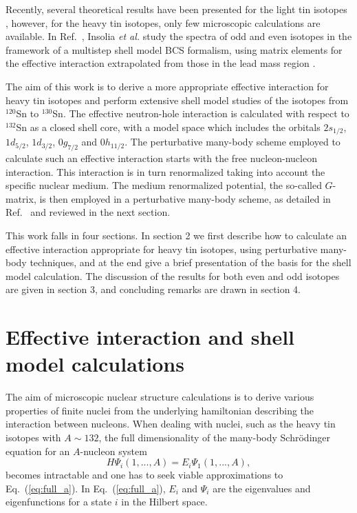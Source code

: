 Recently, several
theoretical results have been presented for the light tin isotopes
\cite{ehho95,ehho93,heho94a,hko95,nicu94,brown94}, however, for the 
heavy tin isotopes, only few 
microscopic calculations are available.
In Ref.\ 
\cite{nicu93}, Insolia {\em et al.} study the spectra of odd and even 
isotopes in the framework of a multistep 
shell model BCS formalism,
using matrix elements for the effective interaction extrapolated
from those in the lead mass region \cite{pomar90}. 

The aim of this work is to derive a more appropriate 
effective interaction for heavy tin isotopes and perform
extensive shell model studies of the isotopes from
$^{120}$Sn to $^{130}$Sn.
The effective neutron-hole interaction
is calculated with respect to
$^{132}$Sn as a closed shell core, with a model space which 
includes the orbitals
$2s_{1/2}$, $1d_{5/2}$, $1d_{3/2}$, $0g_{7/2}$ and $0h_{11/2}$.
The perturbative many-body scheme employed to calculate such
an effective interaction starts with the free nucleon-nucleon
interaction. This interaction is in turn renormalized
taking into account the specific nuclear medium. The medium
renormalized potential, the so-called $G$-matrix, is then
employed in a perturbative many-body scheme, as detailed in
Ref.\ \cite{hko95} and reviewed in the next section. 

This work falls in four sections. In section 2 we first describe how to 
calculate an effective interaction appropriate for heavy tin isotopes, 
using perturbative many-body techniques, and at the end give a brief 
presentation of the basis for the shell model calculation.
The discussion of the results for both even and odd isotopes 
are given in section 3, and concluding remarks are drawn in section 4. 

\section{Effective interaction and shell model calculations}

The aim of microscopic nuclear structure calculations is to derive
various properties of finite nuclei from the underlying 
hamiltonian describing the interaction between 
nucleons. 
When dealing with nuclei, such as the heavy tin isotopes with $A\sim 132$, 
the full dimensionality of the 
many-body Schr\"{o}dinger equation for an $A$-nucleon system
\begin{equation}
     H\Psi_i(1,...,A)=E_i\Psi_1(1,...,A),
     \label{eq:full_a}
\end{equation}
becomes intractable and one has to seek 
viable approximations to Eq.\ (\ref{eq:full_a}). 
In Eq.\ (\ref{eq:full_a}), $E_i$ and $\Psi_i$ 
are the eigenvalues and eigenfunctions
for a state $i$ in the Hilbert space.

